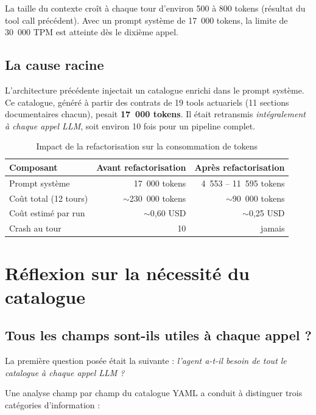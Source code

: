 \documentclass[12pt, a4paper]{article}
\begin{document}
La taille du contexte croît à chaque tour d'environ 500 à 800 tokens
(résultat du tool call précédent). Avec un prompt système de 17~000 tokens,
la limite de 30~000 TPM est atteinte dès le dixième appel.

\subsection{La cause racine}

L'architecture précédente injectait un catalogue enrichi dans le prompt
système. Ce catalogue, généré à partir des contrats de 19 tools actuariels
(11 sections documentaires chacun), pesait \textbf{17~000 tokens}. Il était
retransmis \emph{intégralement à chaque appel LLM}, soit environ 10 fois pour
un pipeline complet.

\begin{table}[h]
\centering
\begin{tabular}{lrr}
\toprule
Composant & Avant refactorisation & Après refactorisation\\
\midrule
Prompt système & 17~000 tokens & 4~553 -- 11~595 tokens\\
Coût total (12 tours) & $\sim$230~000 tokens & $\sim$90~000 tokens\\
Coût estimé par run & $\sim$0,60 USD & $\sim$0,25 USD\\
Crash au tour & 10 & jamais\\
\bottomrule
\end{tabular}
\caption{Impact de la refactorisation sur la consommation de tokens}
\end{table}

\section{Réflexion sur la nécessité du catalogue}

\subsection{Tous les champs sont-ils utiles à chaque appel ?}

La première question posée était la suivante : \emph{l'agent a-t-il besoin de
tout le catalogue à chaque appel LLM ?}

Une analyse champ par champ du catalogue YAML a conduit à distinguer trois
catégories d'information :
\end{document}
